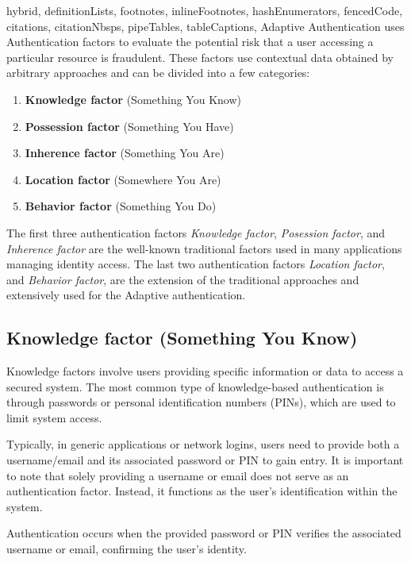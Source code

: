 \documentclass[
  digital,     %
  oneside,     %
  nosansbold,  %
  nocolorbold, %
  lof,         %
  lot,         %
]{fithesis4}
\begin{document}
\begin{markdown*}{%
  hybrid,
  definitionLists,
  footnotes,
  inlineFootnotes,
  hashEnumerators,
  fencedCode,
  citations,
  citationNbsps,
  pipeTables,
  tableCaptions,
}
Adaptive Authentication uses Authentication factors to evaluate the potential risk that a user accessing a particular resource is fraudulent.
\newline
\newline
These factors use contextual data obtained by arbitrary approaches and can be divided into a few categories:

\begin{enumerate}
    \item \textbf{Knowledge factor} (Something You Know)
    \item \textbf{Possession factor}  (Something You Have)
    \item \textbf{Inherence factor} (Something You Are)
    \item \textbf{Location factor} (Somewhere You Are)
    \item \textbf{Behavior factor} (Something You Do)
\end{enumerate}

The first three authentication factors \textit{Knowledge factor}, \textit{Posession factor}, and \textit{Inherence factor} are the well-known traditional factors used in many applications managing identity access.
The last two authentication factors \textit{Location factor}, and \textit{Behavior factor}, are the extension of the traditional approaches and extensively used for the Adaptive authentication.  

\newpage
\subsection{Knowledge factor (Something You Know)}
Knowledge factors involve users providing specific information or data to access a secured system.
The most common type of knowledge-based authentication is through passwords or personal identification numbers (PINs), which are used to limit system access.

Typically, in generic applications or network logins, users need to provide both a username/email and its associated password or PIN to gain entry. It is important to note that solely providing a username or email does not serve as an authentication factor.
Instead, it functions as the user's identification within the system.

Authentication occurs when the provided password or PIN verifies the associated username or email, confirming the user's identity.


\end{markdown*}
\end{document}
